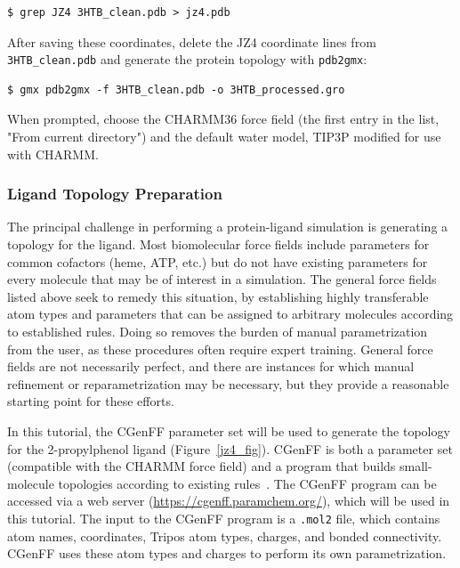 \documentclass[9pt,tutorial,pubversion]{livecoms}
\begin{document}
\begin{lstlisting}
$ grep JZ4 3HTB_clean.pdb > jz4.pdb
\end{lstlisting}
%
After saving these coordinates, delete the JZ4 coordinate lines from \texttt{3HTB\_clean.pdb} and generate the protein topology with \texttt{pdb2gmx}:

\begin{lstlisting}
$ gmx pdb2gmx -f 3HTB_clean.pdb -o 3HTB_processed.gro
\end{lstlisting}
%
When prompted, choose the CHARMM36 force field (the first entry in the list, "From current directory") and the default water model, TIP3P modified for use with CHARMM.

\subsubsection{Ligand Topology Preparation} \label{complex_lig_top}

The principal challenge in performing a protein-ligand simulation is generating a topology for the ligand. Most biomolecular force fields include parameters for common cofactors (heme, ATP, etc.) but do not have existing parameters for every molecule that may be of interest in a simulation. The general force fields listed above seek to remedy this situation, by establishing highly transferable atom types and parameters that can be assigned to arbitrary molecules according to established rules. Doing so removes the burden of manual parametrization from the user, as these procedures often require expert training. General force fields are not necessarily perfect, and there are instances for which manual refinement or reparametrization may be necessary, but they provide a reasonable starting point for these efforts.

In this tutorial, the CGenFF parameter set will be used to generate the topology for the 2-propylphenol ligand (Figure~\ref{jz4_fig}). CGenFF is both a parameter set (compatible with the CHARMM force field) and a program that builds small-molecule topologies according to existing rules~\cite{Vanommeslaeghe2012a,Vanommeslaeghe2012b}. The CGenFF program can be accessed via a web server (\url{https://cgenff.paramchem.org/}), which will be used in this tutorial. The input to the CGenFF program is a \texttt{.mol2} file, which contains atom names, coordinates, Tripos atom types, charges, and bonded connectivity. CGenFF uses these atom types and charges to perform its own parametrization.
\end{document}
